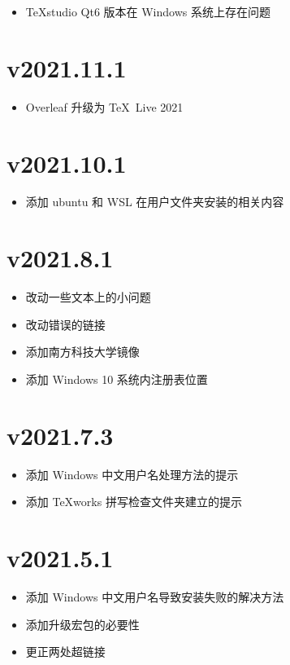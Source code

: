 \begin{itemize}
  \item \TeX studio Qt6 版本在 Windows 系统上存在问题
\end{itemize}

\section*{v2021.11.1}

\begin{itemize}
  \item Overleaf 升级为 \TeX~Live 2021
\end{itemize}

\section*{v2021.10.1}

\begin{itemize}
  \item 添加 ubuntu 和 WSL 在用户文件夹安装的相关内容
\end{itemize}

\section*{v2021.8.1}

\begin{itemize}
  \item 改动一些文本上的小问题
  \item 改动错误的链接
  \item 添加南方科技大学镜像
  \item 添加 Windows 10 系统内注册表位置
\end{itemize}

\section*{v2021.7.3}

\begin{itemize}
  \item 添加 Windows 中文用户名处理方法的提示
  \item 添加 \TeX works 拼写检查文件夹建立的提示
\end{itemize}

\section*{v2021.5.1}

\begin{itemize}
  \item 添加 Windows 中文用户名导致安装失败的解决方法
  \item 添加升级宏包的必要性
  \item 更正两处超链接
\end{itemize}

